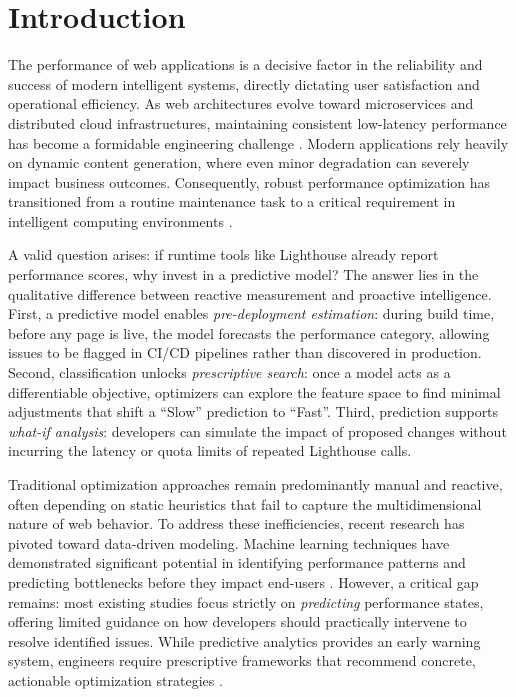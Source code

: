 \documentclass[conference]{IEEEtran}
\begin{document}
\section{Introduction}\label{sec1}

The performance of web applications is a decisive factor in the reliability and success of modern intelligent systems, directly dictating user satisfaction and operational efficiency. As web architectures evolve toward microservices and distributed cloud infrastructures, maintaining consistent low-latency performance has become a formidable engineering challenge \cite{kaushik2024, xin2023}. Modern applications rely heavily on dynamic content generation, where even minor degradation can severely impact business outcomes. Consequently, robust performance optimization has transitioned from a routine maintenance task to a critical requirement in intelligent computing environments \cite{dakic2025}.

A valid question arises: if runtime tools like Lighthouse already report performance scores, why invest in a predictive model? The answer lies in the qualitative difference between reactive measurement and proactive intelligence. First, a predictive model enables \textit{pre-deployment estimation}: during build time, before any page is live, the model forecasts the performance category, allowing issues to be flagged in CI/CD pipelines rather than discovered in production. Second, classification unlocks \textit{prescriptive search}: once a model acts as a differentiable objective, optimizers can explore the feature space to find minimal adjustments that shift a ``Slow'' prediction to ``Fast''. Third, prediction supports \textit{what-if analysis}: developers can simulate the impact of proposed changes without incurring the latency or quota limits of repeated Lighthouse calls.

Traditional optimization approaches remain predominantly manual and reactive, often depending on static heuristics that fail to capture the multidimensional nature of web behavior. To address these inefficiencies, recent research has pivoted toward data-driven modeling. Machine learning techniques have demonstrated significant potential in identifying performance patterns and predicting bottlenecks before they impact end-users \cite{ghattas2025, mathur2024}. However, a critical gap remains: most existing studies focus strictly on \textit{predicting} performance states, offering limited guidance on how developers should practically intervene to resolve identified issues. While predictive analytics provides an early warning system, engineers require prescriptive frameworks that recommend concrete, actionable optimization strategies \cite{notz2024}.
\end{document}

